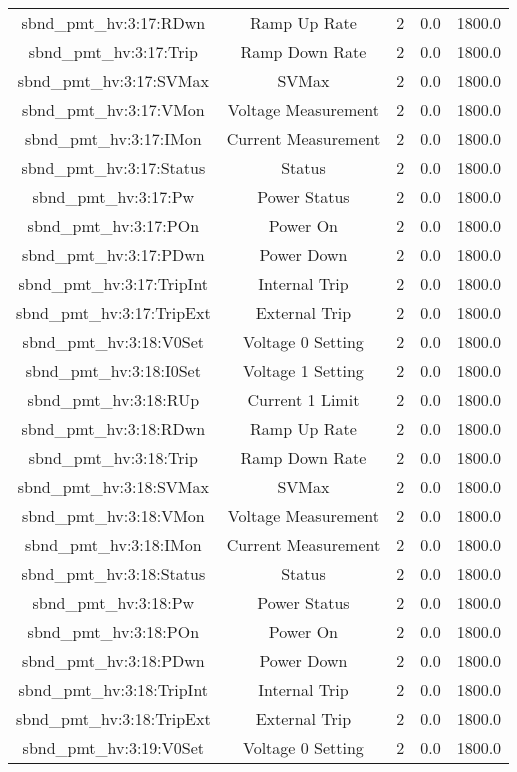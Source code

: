\begin{table}[ptb]
\begin{tabular}{c | c c c c}
sbnd_pmt_hv:3:17:RDwn & Ramp Up Rate & 2 & 0.0 & 1800.0\\ 
sbnd_pmt_hv:3:17:Trip & Ramp Down Rate & 2 & 0.0 & 1800.0\\ 
sbnd_pmt_hv:3:17:SVMax & SVMax & 2 & 0.0 & 1800.0\\ 
sbnd_pmt_hv:3:17:VMon & Voltage Measurement & 2 & 0.0 & 1800.0\\ 
sbnd_pmt_hv:3:17:IMon & Current Measurement & 2 & 0.0 & 1800.0\\ 
sbnd_pmt_hv:3:17:Status & Status & 2 & 0.0 & 1800.0\\ 
sbnd_pmt_hv:3:17:Pw & Power Status & 2 & 0.0 & 1800.0\\ 
sbnd_pmt_hv:3:17:POn & Power On & 2 & 0.0 & 1800.0\\ 
sbnd_pmt_hv:3:17:PDwn & Power Down & 2 & 0.0 & 1800.0\\ 
sbnd_pmt_hv:3:17:TripInt & Internal Trip & 2 & 0.0 & 1800.0\\ 
sbnd_pmt_hv:3:17:TripExt & External Trip & 2 & 0.0 & 1800.0\\ 
sbnd_pmt_hv:3:18:V0Set & Voltage 0 Setting & 2 & 0.0 & 1800.0\\ 
sbnd_pmt_hv:3:18:I0Set & Voltage 1 Setting & 2 & 0.0 & 1800.0\\ 
sbnd_pmt_hv:3:18:RUp & Current 1 Limit & 2 & 0.0 & 1800.0\\ 
sbnd_pmt_hv:3:18:RDwn & Ramp Up Rate & 2 & 0.0 & 1800.0\\ 
sbnd_pmt_hv:3:18:Trip & Ramp Down Rate & 2 & 0.0 & 1800.0\\ 
sbnd_pmt_hv:3:18:SVMax & SVMax & 2 & 0.0 & 1800.0\\ 
sbnd_pmt_hv:3:18:VMon & Voltage Measurement & 2 & 0.0 & 1800.0\\ 
sbnd_pmt_hv:3:18:IMon & Current Measurement & 2 & 0.0 & 1800.0\\ 
sbnd_pmt_hv:3:18:Status & Status & 2 & 0.0 & 1800.0\\ 
sbnd_pmt_hv:3:18:Pw & Power Status & 2 & 0.0 & 1800.0\\ 
sbnd_pmt_hv:3:18:POn & Power On & 2 & 0.0 & 1800.0\\ 
sbnd_pmt_hv:3:18:PDwn & Power Down & 2 & 0.0 & 1800.0\\ 
sbnd_pmt_hv:3:18:TripInt & Internal Trip & 2 & 0.0 & 1800.0\\ 
sbnd_pmt_hv:3:18:TripExt & External Trip & 2 & 0.0 & 1800.0\\ 
sbnd_pmt_hv:3:19:V0Set & Voltage 0 Setting & 2 & 0.0 & 1800.0\\ 

\end{tabular}
\end{table}
